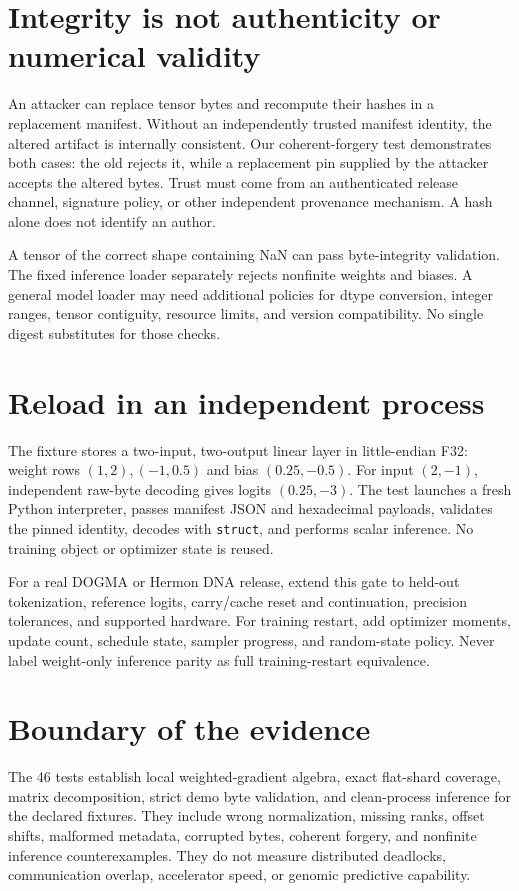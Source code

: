 \section{Integrity is not authenticity or numerical validity}
An attacker can replace tensor bytes and recompute their hashes in a replacement
manifest. Without an independently trusted manifest identity, the altered artifact
is internally consistent. Our coherent-forgery test demonstrates both cases:
the old  rejects it, while a replacement pin supplied by the attacker accepts
the altered bytes. Trust must come from an authenticated release channel,
signature policy, or other independent provenance mechanism. A hash alone does
not identify an author.

A tensor of the correct shape containing NaN can pass byte-integrity validation.
The fixed inference loader separately rejects nonfinite weights and biases.
A general model loader may need additional policies for dtype conversion,
integer ranges, tensor contiguity, resource limits, and version compatibility.
No single digest substitutes for those checks.

\section{Reload in an independent process}
The fixture stores a two-input, two-output linear layer in little-endian F32:
weight rows $(1,2),(-1,0.5)$ and bias $(0.25,-0.5)$.
For input $(2,-1)$, independent raw-byte decoding gives logits $(0.25,-3)$.
The test launches a fresh Python interpreter, passes manifest JSON and hexadecimal
payloads, validates the pinned identity, decodes with \texttt{struct}, and performs
scalar inference. No training object or optimizer state is reused.

For a real DOGMA or Hermon DNA release, extend this gate to held-out tokenization,
reference logits, carry/cache reset and continuation, precision tolerances,
and supported hardware. For training restart, add optimizer moments, update
count, schedule state, sampler progress, and random-state policy. Never label
weight-only inference parity as full training-restart equivalence.

\section{Boundary of the evidence}
The 46 tests establish local weighted-gradient algebra, exact flat-shard coverage,
matrix decomposition, strict demo byte validation, and clean-process inference
for the declared fixtures. They include wrong normalization, missing ranks,
offset shifts, malformed metadata, corrupted bytes, coherent forgery, and nonfinite
inference counterexamples. They do not measure distributed deadlocks, communication
overlap, accelerator speed, or genomic predictive capability.

